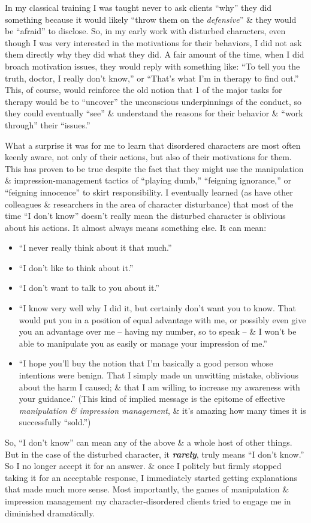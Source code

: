 \documentclass{article}
\numberwithin{equation}{section}
\begin{document}
In my classical training I was taught never to ask clients ``why'' they did something because it would likely ``throw them on the \textit{defensive}'' \& they would be ``afraid'' to disclose. So, in my early work with disturbed characters, even though I was very interested in the motivations for their behaviors, I did not ask them directly why they did what they did. A fair amount of the time, when I did broach motivation issues, they would reply with something like: ``To tell you the truth, doctor, I really don't know,'' or ``That's what I'm in therapy to find out.'' This, of course, would reinforce the old notion that 1 of the major tasks for therapy would be to ``uncover'' the unconscious underpinnings of the conduct, so they could eventually ``see'' \& understand the reasons for their behavior \& ``work through'' their ``issues.''

What a surprise it was for me to learn that disordered characters are most often keenly aware, not only of their actions, but also of their motivations for them. This has proven to be true despite the fact that they might use the manipulation \& impression-management tactics of ``playing dumb,'' ``feigning ignorance,'' or ``feigning innocence'' to skirt responsibility. I eventually learned (as have other colleagues \& researchers in the area of character disturbance) that most of the time ``I don't know'' doesn't really mean the disturbed character is oblivious about his actions. It almost always means something else. It can mean:
\begin{itemize}
	\item ``I never really think about it that much.''
	\item ``I don't like to think about it.''
	\item ``I don't want to talk to you about it.''
	\item ``I know very well why I did it, but certainly don't want you to know. That would put you in a position of equal advantage with me, or possibly even give you an advantage over me -- having my number, so to speak -- \& I won't be able to manipulate you as easily or manage your impression of me.''
	\item ``I hope you'll buy the notion that I'm basically a good person whose intentions were benign. That I simply made un unwitting mistake, oblivious about the harm I caused; \& that I am willing to increase my awareness with your guidance.'' (This kind of implied message is the epitome of effective \textit{manipulation \& impression management}, \& it's amazing how many times it is successfully ``sold.'')
\end{itemize}
So, ``I don't know'' can mean any of the above \& a whole host of other things. But in the case of the disturbed character, it \textbf{\textit{rarely}}, truly means ``I don't know.'' So I no longer accept it for an answer. \& once I politely but firmly stopped taking it for an acceptable response, I immediately started getting explanations that made much more sense. Most importantly, the games of manipulation \& impression management my character-disordered clients tried to engage me in diminished dramatically.
\end{document}
